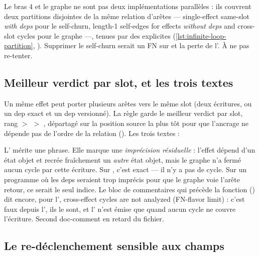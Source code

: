 \begin{decision}
Le bras 4 et le graphe ne sont pas deux implémentations parallèles : ils couvrent deux partitions disjointes de la même relation d'arêtes --- \og single-effect same-slot \emph{with deps}\fg{} pour le self-churn, \og length-1 self-edges for effects \emph{without deps} and cross-slot cycles\fg{} pour le graphe ---, tenues par des  explicites (\cref{lst:infinite-loop-partition}, ). Supprimer le self-churn serait un FN sur  et la perte de l'\Info. À ne pas re-tenter.
\end{decision}

\subsection{Meilleur verdict par slot, et les trois textes}

Un même effet peut porter plusieurs arêtes vers le même slot (deux écritures, ou un dep exact et un dep versionné). La règle garde le meilleur verdict par slot, rang \Error{} $>$ \Warning{} $>$ \Info, départagé sur la position source la plus tôt pour que l'ancrage ne dépende pas de l'ordre de la relation (). Les trois textes :


L'\Info{} mérite une phrase. Elle marque une \emph{imprécision résiduelle} : l'effet dépend d'un état objet et recrée fraîchement un \emph{autre} état objet, mais le graphe n'a fermé aucun cycle par cette écriture. Sur , c'est exact --- il n'y a pas de cycle. Sur un programme où les deps seraient trop imprécis pour que le graphe voie l'arête retour, ce serait le seul indice. Le bloc de commentaires qui précède la fonction () dit encore, pour l'\Info, \og cross-effect cycles are not analyzed (FN-flavor limit)\fg{} : c'est faux depuis l', ils le sont, et l'\Info{} n'est émise que quand aucun cycle ne couvre l'écriture. Second doc-comment en retard du fichier.

\subsection{Le re-déclenchement sensible aux champs}
\label{sec:infinite-loop-fields}

